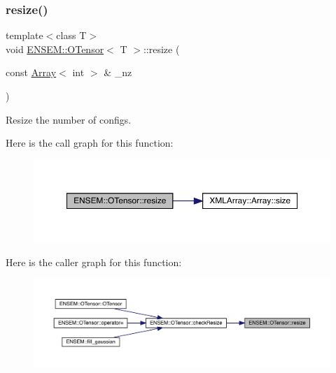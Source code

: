 \subsubsection{\texorpdfstring{resize()}{resize()}\hspace{0.1cm}{\footnotesize\ttfamily [1/4]}}
{\footnotesize\ttfamily template$<$class T$>$ \\
void \mbox{\hyperlink{classENSEM_1_1OTensor}{E\+N\+S\+E\+M\+::\+O\+Tensor}}$<$ T $>$\+::resize (\begin{DoxyParamCaption}\item[{const \mbox{\hyperlink{classXMLArray_1_1Array}{Array}}$<$ int $>$ \&}]{\+\_\+nz }\end{DoxyParamCaption})\hspace{0.3cm}{\ttfamily [inline]}}



Resize the number of configs. 

Here is the call graph for this function\+:
\nopagebreak
\begin{figure}[H]
\begin{center}
\leavevmode
\includegraphics[width=350pt]{da/d8a/classENSEM_1_1OTensor_abe0bd734d08b1140d7794ec760a89435_cgraph}
\end{center}
\end{figure}
Here is the caller graph for this function\+:\nopagebreak
\begin{figure}[H]
\begin{center}
\leavevmode
\includegraphics[width=350pt]{da/d8a/classENSEM_1_1OTensor_abe0bd734d08b1140d7794ec760a89435_icgraph}
\end{center}
\end{figure}
\mbox{\label{classENSEM_1_1OTensor_abe0bd734d08b1140d7794ec760a89435}} 

